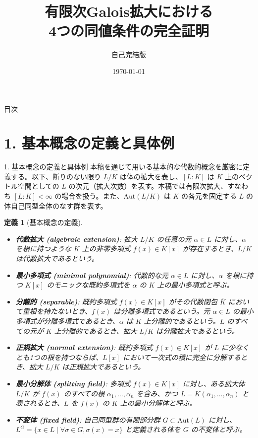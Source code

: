 \documentclass[11pt,dvipsnames]{beamer}
\title[Galois拡大の4条件]{有限次Galois拡大における\\4つの同値条件の完全証明}
\subtitle{自己完結版}
\author{}
\date{\today}
\newtheorem{dfn}[thm]{定義}
\begin{document}
\begin{frame}
    \titlepage
\end{frame}

\begin{frame}{目次}
    \tableofcontents
\end{frame}

\section{1. 基本概念の定義と具体例}

\begin{frame}[allowframebreaks]{1. 基本概念の定義と具体例}
    本稿を通じて用いる基本的な代数的概念を厳密に定義する。以下、断りのない限り $L/K$ は体の拡大を表し、$[L:K]$ は $K$ 上のベクトル空間としての $L$ の次元（拡大次数）を表す。本稿では有限次拡大、すなわち $[L:K] < \infty$ の場合を扱う。また、$\mathrm{Aut}(L/K)$ は $K$ の各元を固定する $L$ の体自己同型全体のなす群を表す。

    \begin{dfn}[基本概念の定義]
        \begin{itemize}
            \item \textbf{代数拡大 (algebraic extension)}: 拡大 $L/K$ の任意の元 $\alpha \in L$ に対し、$\alpha$ を根に持つような $K$ 上の非零多項式 $f(x) \in K[x]$ が存在するとき、$L/K$ は代数拡大であるという。
            \item \textbf{最小多項式 (minimal polynomial)}: 代数的な元 $\alpha \in L$ に対し、$\alpha$ を根に持つ $K[x]$ のモニックな既約多項式を $\alpha$ の $K$ 上の最小多項式と呼ぶ。
            \item \textbf{分離的 (separable)}: 既約多項式 $f(x) \in K[x]$ がその代数閉包 $\overline{K}$ において重根を持たないとき、$f(x)$ は分離多項式であるという。元 $\alpha \in L$ の最小多項式が分離多項式であるとき、$\alpha$ は $K$ 上分離的であるという。$L$ のすべての元が $K$ 上分離的であるとき、拡大 $L/K$ は分離拡大であるという。
            \item \textbf{正規拡大 (normal extension)}: 既約多項式 $f(x) \in K[x]$ が $L$ に少なくとも1つの根を持つならば、$L[x]$ において一次式の積に完全に分解するとき、拡大 $L/K$ は正規拡大であるという。
            \item \textbf{最小分解体 (splitting field)}: 多項式 $f(x) \in K[x]$ に対し、ある拡大体 $L/K$ が $f(x)$ のすべての根 $\alpha_1, \dots, \alpha_n$ を含み、かつ $L = K(\alpha_1, \dots, \alpha_n)$ と表されるとき、$L$ を $f(x)$ の $K$ 上の最小分解体と呼ぶ。
            \item \textbf{不変体 (fixed field)}: 自己同型群の有限部分群 $G \subset \mathrm{Aut}(L)$ に対し、$L^G = \{ x \in L \mid \forall \sigma \in G, \sigma(x) = x \}$ と定義される体を $G$ の不変体と呼ぶ。
        \end{itemize}
    \end{dfn}
\end{frame}
\end{document}
